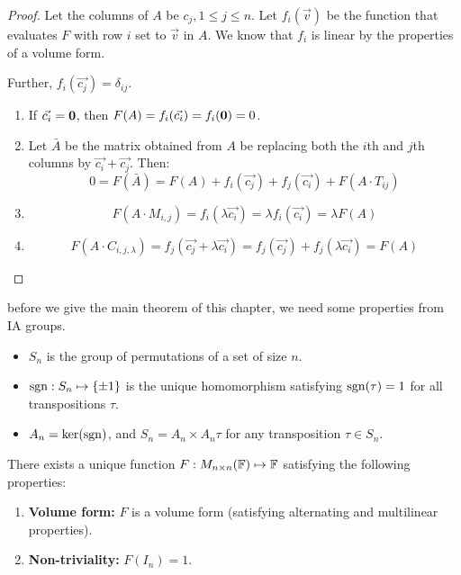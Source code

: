 \documentclass[../Main.tex]{subfiles}
\begin{document}
\begin{proof}
    Let the columns of $A$ be $c_j, 1 \leq j \leq n$. Let $f_i(\vec{v})$ be the function that evaluates $F$ with row $i$ set to $\vec{v}$ in $A$. We know that $f_i$ is linear by the properties of a volume form.

    Further, $f_i(\vec{c_j}) = \delta_{ij}$.
    \begin{enumerate}
        \item If $\vec{c_i} = \boldsymbol{0}$, then $F(A) = f_i(\vec{c_i}) = f_i(\boldsymbol{0}) = 0$.
        \item Let $\bar{A}$ be the matrix obtained from $A$ be replacing both the $i$th and $j$th columns by $\vec{c_i} + \vec{c_j}$. Then:
            \begin{equation*}
                0 = F(\bar{A}) = F(A) + f_i(\vec{c_j}) + f_j(\vec{c_i}) + F(A \cdot T_{ij})
            \end{equation*}
        \item \begin{equation*}
            F(A \cdot M_{i, j}) = f_i(\lambda \vec{c_i}) = \lambda f_i(\vec{c_i}) = \lambda F(A)
        \end{equation*}
        \item \begin{equation*}
            F(A \cdot C_{i, j, \lambda}) = f_j(\vec{c_j} + \lambda \vec{c_i}) = f_j(\vec{c_j}) + f_j(\lambda \vec{c_i}) = F(A)
        \end{equation*}
    \end{enumerate}
\end{proof}
before we give the main theorem of this chapter, we need some properties from IA groups.
\begin{itemize}
    \item $S_n$ is the group of permutations of a set of size $n$.
    \item $\operatorname{sgn} : S_n \mapsto \{\pm1\}$ is the unique homomorphism satisfying $\operatorname{sgn}(\tau) = 1$ for all transpositions $\tau$.
    \item $A_n = \ker(\operatorname{sgn})$, and $S_n = A_n \times A_n\tau$ for any transposition $\tau \in S_n$.
\end{itemize}
\begin{theorem}
    There exists a unique function $F : M_{n \times n}(\mathbb{F}) \mapsto \mathbb{F}$ satisfying the following properties:
    \begin{enumerate}
        \item \textbf{Volume form:} $F$ is a volume form (satisfying alternating and multilinear properties).
        \item \textbf{Non-triviality:} $F(I_n) = 1$.
    \end{enumerate}
    \label{thmDeterminant}
\end{theorem}
\end{document}
